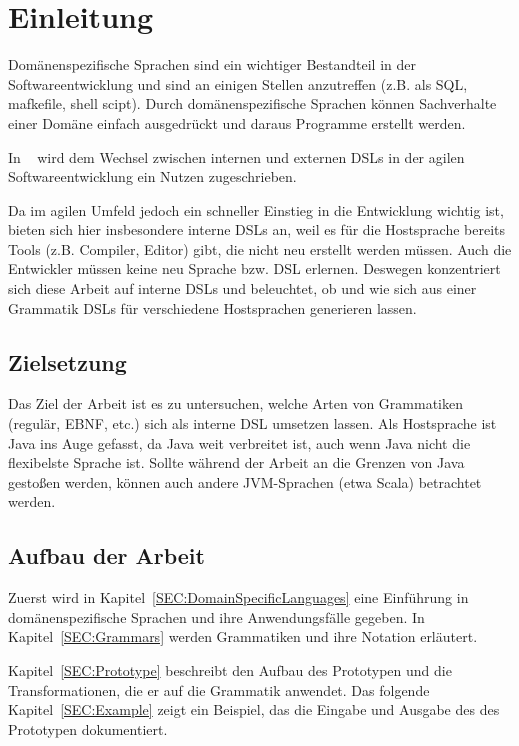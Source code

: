 \documentclass[../InterneDSLs.tex]{subfiles}
\begin{document}
\chapter{Einleitung}
Domänenspezifische Sprachen sind ein wichtiger Bestandteil in der Softwareentwicklung und sind an einigen Stellen anzutreffen (z.B. als SQL, mafkefile, shell scipt). Durch domänenspezifische Sprachen können Sachverhalte einer Domäne einfach ausgedrückt und daraus Programme erstellt werden. 

In ~\cite{butting2018deriving} wird dem Wechsel zwischen internen und externen DSLs in der agilen Softwareentwicklung ein Nutzen zugeschrieben.

Da im agilen Umfeld jedoch ein schneller Einstieg in die Entwicklung wichtig ist, bieten sich hier insbesondere interne \acsp{DSL} an, weil es für die Hostsprache bereits Tools (z.B. Compiler, Editor) gibt, die nicht neu erstellt werden müssen. Auch die Entwickler müssen keine neu Sprache bzw. DSL erlernen. Deswegen konzentriert sich diese Arbeit auf interne DSLs und beleuchtet, ob und wie sich aus einer Grammatik DSLs für verschiedene Hostsprachen generieren lassen.


\section{Zielsetzung}
Das Ziel der Arbeit ist es zu untersuchen, welche Arten von Grammatiken (regulär, \ac{EBNF}, etc.) sich als interne DSL umsetzen lassen. Als Hostsprache ist Java ins Auge gefasst, da Java weit verbreitet ist, auch wenn Java nicht die flexibelste Sprache ist. Sollte während der Arbeit an die Grenzen von Java gestoßen werden, können auch andere \ac{JVM}-Sprachen (etwa Scala) betrachtet werden.


\section{Aufbau der Arbeit}
Zuerst wird in Kapitel~\ref{SEC:DomainSpecificLanguages} eine Einführung in domänenspezifische Sprachen und ihre Anwendungsfälle gegeben. In Kapitel~\ref{SEC:Grammars} werden Grammatiken und ihre Notation erläutert.

Kapitel~\ref{SEC:Prototype} beschreibt den Aufbau des Prototypen und die Transformationen, die er auf die Grammatik anwendet. Das folgende Kapitel~\ref{SEC:Example} zeigt ein Beispiel, das die Eingabe und Ausgabe des des Prototypen dokumentiert.
\end{document}
